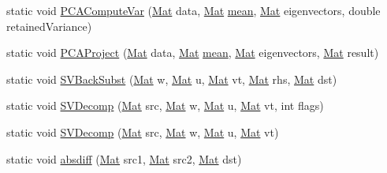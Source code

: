 \begin{DoxyCompactItemize}
\item 
static void \mbox{\hyperlink{classorg_1_1opencv_1_1core_1_1_core_a05764d4479aec67351a6c96915053333}{P\+C\+A\+Compute\+Var}} (\mbox{\hyperlink{classorg_1_1opencv_1_1core_1_1_mat}{Mat}} data, \mbox{\hyperlink{classorg_1_1opencv_1_1core_1_1_mat}{Mat}} \mbox{\hyperlink{classorg_1_1opencv_1_1core_1_1_core_aff700e66b1cef1a74cfd94d405369edf}{mean}}, \mbox{\hyperlink{classorg_1_1opencv_1_1core_1_1_mat}{Mat}} eigenvectors, double retained\+Variance)
\item 
static void \mbox{\hyperlink{classorg_1_1opencv_1_1core_1_1_core_ac1b1800fd7a0b44ef5c5fbfe45d42eda}{P\+C\+A\+Project}} (\mbox{\hyperlink{classorg_1_1opencv_1_1core_1_1_mat}{Mat}} data, \mbox{\hyperlink{classorg_1_1opencv_1_1core_1_1_mat}{Mat}} \mbox{\hyperlink{classorg_1_1opencv_1_1core_1_1_core_aff700e66b1cef1a74cfd94d405369edf}{mean}}, \mbox{\hyperlink{classorg_1_1opencv_1_1core_1_1_mat}{Mat}} eigenvectors, \mbox{\hyperlink{classorg_1_1opencv_1_1core_1_1_mat}{Mat}} result)
\item 
static void \mbox{\hyperlink{classorg_1_1opencv_1_1core_1_1_core_a8f8ec69060789e7183c4a2a49dd729d9}{S\+V\+Back\+Subst}} (\mbox{\hyperlink{classorg_1_1opencv_1_1core_1_1_mat}{Mat}} w, \mbox{\hyperlink{classorg_1_1opencv_1_1core_1_1_mat}{Mat}} u, \mbox{\hyperlink{classorg_1_1opencv_1_1core_1_1_mat}{Mat}} vt, \mbox{\hyperlink{classorg_1_1opencv_1_1core_1_1_mat}{Mat}} rhs, \mbox{\hyperlink{classorg_1_1opencv_1_1core_1_1_mat}{Mat}} dst)
\item 
static void \mbox{\hyperlink{classorg_1_1opencv_1_1core_1_1_core_a8b6381c8ddf094439720386b1acdb9ce}{S\+V\+Decomp}} (\mbox{\hyperlink{classorg_1_1opencv_1_1core_1_1_mat}{Mat}} src, \mbox{\hyperlink{classorg_1_1opencv_1_1core_1_1_mat}{Mat}} w, \mbox{\hyperlink{classorg_1_1opencv_1_1core_1_1_mat}{Mat}} u, \mbox{\hyperlink{classorg_1_1opencv_1_1core_1_1_mat}{Mat}} vt, int flags)
\item 
static void \mbox{\hyperlink{classorg_1_1opencv_1_1core_1_1_core_aa2a097bef3c1f59efe29e6a723640851}{S\+V\+Decomp}} (\mbox{\hyperlink{classorg_1_1opencv_1_1core_1_1_mat}{Mat}} src, \mbox{\hyperlink{classorg_1_1opencv_1_1core_1_1_mat}{Mat}} w, \mbox{\hyperlink{classorg_1_1opencv_1_1core_1_1_mat}{Mat}} u, \mbox{\hyperlink{classorg_1_1opencv_1_1core_1_1_mat}{Mat}} vt)
\item 
static void \mbox{\hyperlink{classorg_1_1opencv_1_1core_1_1_core_a7ca624705224f143de9fea745ae576d0}{absdiff}} (\mbox{\hyperlink{classorg_1_1opencv_1_1core_1_1_mat}{Mat}} src1, \mbox{\hyperlink{classorg_1_1opencv_1_1core_1_1_mat}{Mat}} src2, \mbox{\hyperlink{classorg_1_1opencv_1_1core_1_1_mat}{Mat}} dst)

\end{DoxyCompactItemize}
